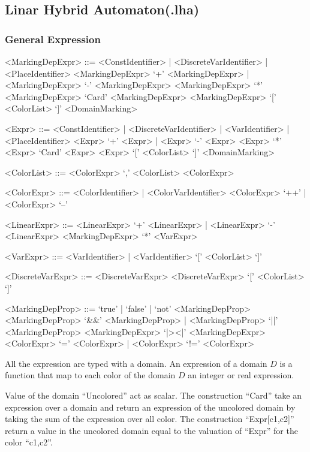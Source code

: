 \documentclass{article}
\begin{document}
\subsection{Linar Hybrid Automaton(.lha)}


\subsubsection{General Expression}

\begin{scriptsize}
\begin{grammar}
  <MarkingDepExpr> ::= <ConstIdentifier> | <DiscreteVarIdentifier> | <PlaceIdentifier>
  \alt  <MarkingDepExpr> `+'  <MarkingDepExpr> | <MarkingDepExpr> `-'  <MarkingDepExpr>
  \alt  <MarkingDepExpr> `*'  <MarkingDepExpr>
  \alt `Card' <MarkingDepExpr>
  \alt <MarkingDepExpr> `[' <ColorList> `]'
  \alt <DomainMarking>

 <Expr> ::= <ConstIdentifier> | <DiscreteVarIdentifier>  | <VarIdentifier> | <PlaceIdentifier>
  \alt  <Expr> `+'  <Expr> | <Expr> `-'  <Expr>
  \alt  <Expr> `*'  <Expr>
  \alt `Card' <Expr>
  \alt <Expr> `[' <ColorList> `]'
  \alt <DomainMarking>

  <ColorList> ::= <ColorExpr> `,' <ColorList>
  \alt <ColorExpr>

  <ColorExpr> ::= <ColorIdentifier> | <ColorVarIdentifier>
  \alt <ColorExpr> `++' | <ColorExpr> `--'

  <LinearExpr> ::= <LinearExpr> `+'  <LinearExpr> | <LinearExpr> `-'  <LinearExpr>
  \alt <MarkingDepExpr> `*' <VarExpr>

  <VarExpr> ::= <VarIdentifier> | <VarIdentifier> `[' <ColorList> `]'

  <DiscreteVarExpr> ::= <DiscreteVarExpr> \alt <DiscreteVarExpr> `[' <ColorList> `]'

<MarkingDepProp> ::= `true' | `false' | `not' <MarkingDepProp>
  \alt <MarkingDepProp> `\&\&' <MarkingDepProp> |  <MarkingDepProp> `||' <MarkingDepProp>
  \alt <MarkingDepExpr> `|\!\!>\!<\!\!|' <MarkingDepExpr>  
  \alt <ColorExpr> `=' <ColorExpr> | <ColorExpr> `!=' <ColorExpr>

\end{grammar}
\end{scriptsize}

All the expression are typed with a domain. An expression of a domain
$D$ is a function that map to each color of the domain $D$ an integer
or real expression. 

Value of the domain ``Uncolored'' act as scalar.  The construction
``Card'' take an expression over a domain and return an expression of
the uncolored domain by taking the sum of the expression over all
color. The construction ``Expr[c1,c2]'' return a value in the
uncolored domain equal to the valuation of ``Expr'' for the color
``c1,c2''.
\end{document}
